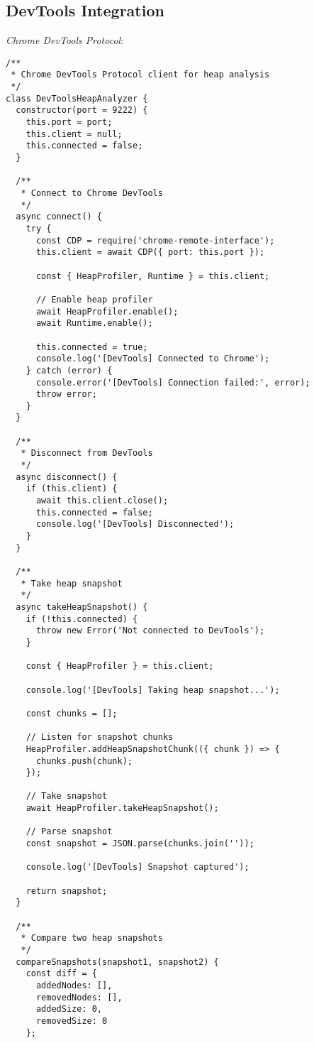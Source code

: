 \documentclass[11pt]{article}
\begin{document}
\subsection{DevTools Integration}
\label{sec:orgcecbd03}

\emph{Chrome DevTools Protocol}:

\begin{verbatim}
/**
 * Chrome DevTools Protocol client for heap analysis
 */
class DevToolsHeapAnalyzer {
  constructor(port = 9222) {
    this.port = port;
    this.client = null;
    this.connected = false;
  }
  
  /**
   * Connect to Chrome DevTools
   */
  async connect() {
    try {
      const CDP = require('chrome-remote-interface');
      this.client = await CDP({ port: this.port });
      
      const { HeapProfiler, Runtime } = this.client;
      
      // Enable heap profiler
      await HeapProfiler.enable();
      await Runtime.enable();
      
      this.connected = true;
      console.log('[DevTools] Connected to Chrome');
    } catch (error) {
      console.error('[DevTools] Connection failed:', error);
      throw error;
    }
  }
  
  /**
   * Disconnect from DevTools
   */
  async disconnect() {
    if (this.client) {
      await this.client.close();
      this.connected = false;
      console.log('[DevTools] Disconnected');
    }
  }
  
  /**
   * Take heap snapshot
   */
  async takeHeapSnapshot() {
    if (!this.connected) {
      throw new Error('Not connected to DevTools');
    }
    
    const { HeapProfiler } = this.client;
    
    console.log('[DevTools] Taking heap snapshot...');
    
    const chunks = [];
    
    // Listen for snapshot chunks
    HeapProfiler.addHeapSnapshotChunk(({ chunk }) => {
      chunks.push(chunk);
    });
    
    // Take snapshot
    await HeapProfiler.takeHeapSnapshot();
    
    // Parse snapshot
    const snapshot = JSON.parse(chunks.join(''));
    
    console.log('[DevTools] Snapshot captured');
    
    return snapshot;
  }
  
  /**
   * Compare two heap snapshots
   */
  compareSnapshots(snapshot1, snapshot2) {
    const diff = {
      addedNodes: [],
      removedNodes: [],
      addedSize: 0,
      removedSize: 0
    };
    

\end{verbatim}
\end{document}

